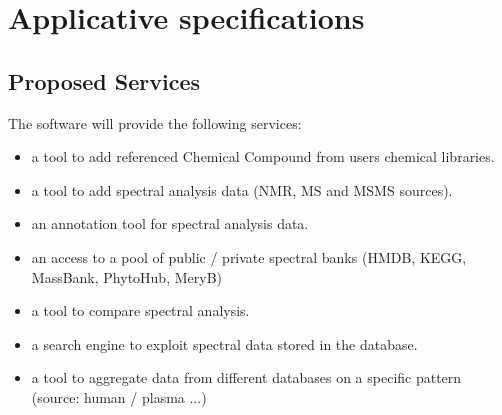


\section{Applicative specifications}

\subsection{Proposed Services}

The software will provide the following services:
\begin{itemize}
	\item a tool to add referenced Chemical Compound from users chemical libraries.
	\item a tool to add spectral analysis data (NMR, MS and MSMS sources).
	\item an annotation tool for spectral analysis data.
	\item an access to a pool of public / private spectral banks (HMDB, KEGG, MassBank, PhytoHub, MeryB) 
	\item a tool to compare spectral analysis.
	\item a search engine to exploit spectral data stored in the database.
	\item a tool to aggregate data from different databases on a specific pattern (\eg source: human / plasma ...)
\end{itemize}

